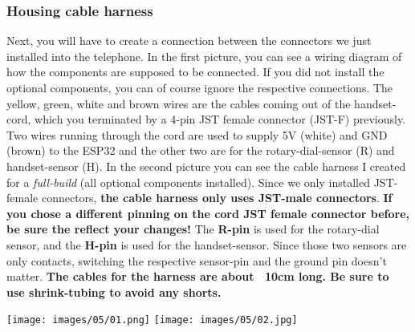 \documentclass[]{article}
\begin{document}
\subsubsection{Housing cable harness}
\begin{minipage}[t]{0.4\linewidth}
	\vspace{0pt}
	Next, you will have to create a connection between the connectors we just installed into the telephone. In the first picture, you can see a wiring diagram of how the components are supposed to be connected. If you did not install the optional components, you can of course ignore the respective connections.
	\newline
	\newline
	The yellow, green, white and brown wires are the cables coming out of the handset-cord, which you terminated by a 4-pin JST female connector (JST-F) previously. Two wires running through the cord are used to supply 5V (white) and GND (brown) to the ESP32 and the other two are for the rotary-dial-sensor (R) and handset-sensor (H).
	\newline
	\newline
	In the second picture you can see the cable harness I created for a \textit{full-build} (all optional components installed). Since we only installed JST-female connectors, \textbf{the cable harness only uses JST-male connectors}. \textbf{If you chose a different pinning on the cord JST female connector before, be sure the reflect your changes!}
	\newline
	\newline
	The \textbf{R-pin} is used for the rotary-dial sensor, and the \textbf{H-pin} is used for the handset-sensor. Since those two sensors are only contacts, switching the respective sensor-pin and the ground pin doesn't matter. \textbf{The cables for the harness are about ~10cm long. Be sure to use shrink-tubing to avoid any shorts.}
\end{minipage}
\hfill
\begin{minipage}[t]{0.5\linewidth}
	\vspace{0pt}
	\texttt{[image: images/05/01.png]}
	\texttt{[image: images/05/02.jpg]}
\end{minipage}
\end{document}
